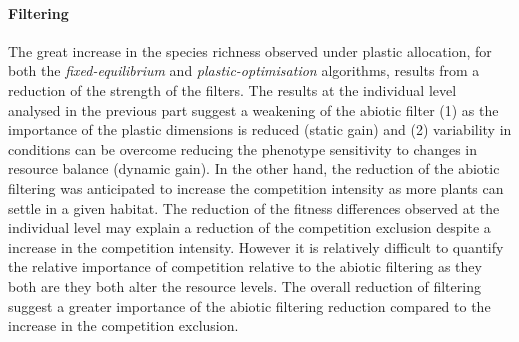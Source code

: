\paragraph{Filtering} 
The great increase in the species richness observed under plastic allocation, for both the \textit{fixed-equilibrium} and \textit{plastic-optimisation} algorithms,  
results from a reduction of the strength of the filters. The results at the individual level analysed in the previous part suggest a weakening of the abiotic filter (1) as the importance of the plastic dimensions is reduced (static gain) and (2) variability in conditions can be overcome reducing the phenotype sensitivity to changes in resource balance (dynamic gain). In the other hand, the reduction of the abiotic filtering was anticipated to increase the competition intensity as more plants can settle in a given habitat. The reduction of the fitness differences observed at the individual level may explain a reduction of the competition exclusion despite a increase in the competition intensity. However it is relatively difficult to quantify the relative importance of competition relative to the abiotic filtering as they both are they both alter the resource levels. The overall reduction of filtering suggest a greater importance of the abiotic filtering reduction compared to the increase in the competition exclusion.


